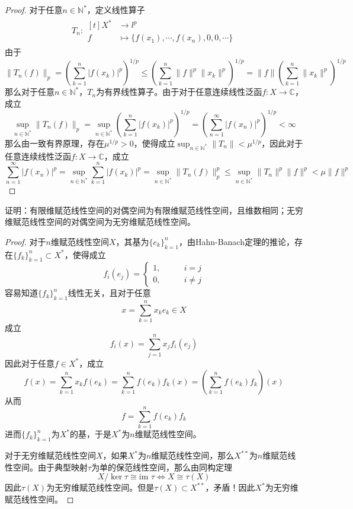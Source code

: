 \documentclass[lang = cn, scheme = chinese, 10pt]{elegantbook}
\newcommand{\N}{\mathbb{N}}  %
\newcommand{\C}{\mathbb{C}}  %
\newcommand{\sub}{\subset}   %
\newcommand{\im}{\text{im }}   %
\begin{document}
\begin{proof}
	对于任意$n\in\mathbb{N}^*$，定义线性算子
	\begin{align*}
		T_n:\begin{aligned}[t]
			X^*&\longrightarrow l^p\\
			f&\longmapsto \{ f(x_1),\cdots,f(x_n),0,0,\cdots \}
		\end{aligned}
	\end{align*}
	由于
	$$
	\|T_n(f)\|_p
	= \left(\sum_{k=1}^{n}|f(x_k)|^p\right)^{1/p}
	\le \left(\sum_{k=1}^{n}\|f\|^p\|x_k\|^p\right)^{1/p}
	= \|f\|\left(\sum_{k=1}^{n}\|x_k\|^p\right)^{1/p}
	$$
	那么对于任意$n\in\N^*$，$T_n$为有界线性算子。由于对于任意连续线性泛函$f:X\to\C$，成立
	$$
	\sup_{n\in\N^*}\|T_n(f)\|_p
	= \sup_{n\in\N^*}\left(\sum_{k=1}^{n}|f(x_k)|^p\right)^{1/p}
	= \left(\sum_{n=1}^{\infty}|f(x_n)|^p\right)^{1/p}
	<\infty
	$$
	那么由一致有界原理，存在$\mu^{1/p}>0$，使得成立$\displaystyle \sup_{n\in\N^*}\|T_n\|<\mu^{1/p}$，因此对于任意连续线性泛函$f:X\to\C$，成立
	$$
	\sum_{n=1}^{\infty}|f(x_n)|^p
	= \sup_{n\in\N^*}\sum_{k=1}^{n}|f(x_k)|^p
	= \sup_{n\in\N^*}\|T_n(f)\|_p^p
	\le \sup_{n\in\N^*}\|T_n\|^p\|f\|^p
	< \mu \|f\|^p
	$$
\end{proof}

\begin{proposition}
	证明：有限维赋范线性空间的对偶空间为有限维赋范线性空间，且维数相同；无穷维赋范线性空间的对偶空间为无穷维赋范线性空间。
\end{proposition}

\begin{proof}
	对于$n$维赋范线性空间$X$，其基为$\{e_k\}_{k=1}^{n}$，由Hahn-Banach定理的推论，存在$\{f_k\}_{k=1}^{n}\sub X^*$，使得成立
	$$
	f_i(e_j)=\begin{cases}
		1,\qquad & i=j\\
		0,\qquad & i\ne j
	\end{cases}
	$$
	容易知道$\{f_k\}_{k=1}^{n}$线性无关，且对于任意
	$$
	x=\sum_{k=1}^{n}x_ke_k\in X
	$$
	成立
	$$
	f_i(x)=\sum_{j=1}^{n}x_jf_i(e_j)
	$$
	因此对于任意$f\in X^*$，成立
	$$
	f(x)=\sum_{k=1}^{n}x_kf(e_k)=\sum_{k=1}^{n}f(e_k)f_k(x)
	=\left(\sum_{k=1}^{n}f(e_k)f_k\right)(x)
	$$
	从而
	$$
	f=\sum_{k=1}^{n}f(e_k)f_k
	$$
	进而$\{f_k\}_{k=1}^{n}$为$X^*$的基，于是$X^*$为$n$维赋范线性空间。
	
	对于无穷维赋范线性空间$X$，如果$X^*$为$n$维赋范线性空间，那么$X^{**}$为$n$维赋范线性空间。由于典型映射$\tau$为单的保范线性空间，那么由同构定理
	$$
	X/\ker\tau\cong\im\tau\iff X\cong \tau(X)
	$$
	因此$\tau(X)$为无穷维赋范线性空间。但是$\tau(X)\sub X^{**}$，矛盾！因此$X^*$为无穷维赋范线性空间。
\end{proof}
\end{document}
